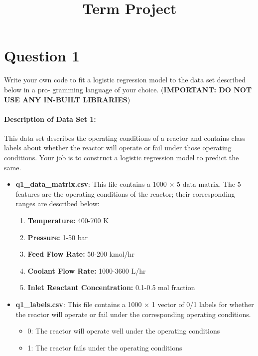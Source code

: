 \documentclass[11pt]{article}
\title{Term Project}
\providecommand{\tightlist}{%
      \setlength{\itemsep}{0pt}\setlength{\parskip}{0pt}}
\begin{document}
    
    
    \maketitle
    
    

    
    \hypertarget{question-1}{%
\section{Question 1}\label{question-1}}

    Write your own code to fit a logistic regression model to the data set
described below in a pro- gramming language of your choice.
(\textbf{IMPORTANT: DO NOT USE ANY IN-BUILT LIBRARIES})

    \hypertarget{description-of-data-set-1}{%
\paragraph{Description of Data Set 1:}\label{description-of-data-set-1}}

    This data set describes the operating conditions of a reactor and
contains class labels about whether the reactor will operate or fail
under those operating conditions. Your job is to construct a logistic
regression model to predict the same.

\begin{itemize}
\item
  \textbf{q1\_data\_matrix.csv}: This file contains a 1000 × 5 data
  matrix. The 5 features are the operating conditions of the reactor;
  their corresponding ranges are described below:

  \begin{enumerate}
  \def\labelenumi{\arabic{enumi}.}
  \tightlist
  \item
    \textbf{Temperature:} 400-700 K
  \item
    \textbf{Pressure:} 1-50 bar
  \item
    \textbf{Feed Flow Rate:} 50-200 kmol/hr
  \item
    \textbf{Coolant Flow Rate:} 1000-3600 L/hr
  \item
    \textbf{Inlet Reactant Concentration:} 0.1-0.5 mol fraction
  \end{enumerate}
\item
  \textbf{q1\_labels.csv}: This file contains a 1000 × 1 vector of 0/1
  labels for whether the reactor will operate or fail under the
  corresponding operating conditions.

  \begin{itemize}
  \tightlist
  \item
    0: The reactor will operate well under the operating conditions
  \item
    1: The reactor fails under the operating conditions
  \end{itemize}
\end{itemize}
\end{document}

